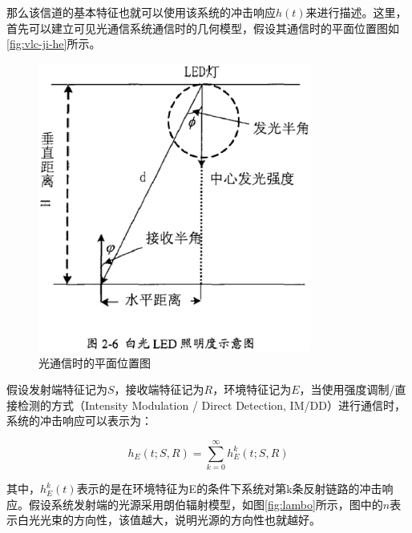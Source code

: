 那么该信道的基本特征也就可以使用该系统的冲击响应$h(t)$来进行描述。这里，首先可以建立可见光通信系统通信时的几何模型，假设其通信时的平面位置图如\autoref{fig:vlc-ji-he}所示。

\begin{figure}[htbp]
    \centering
	\includegraphics[width=0.8\textwidth]{figures/chapter-2/VlcJiHe.eps}
	\caption{光通信时的平面位置图}
	\label{fig:vlc-ji-he}
\end{figure}

假设发射端特征记为$S$，接收端特征记为$R$，环境特征记为$E$，当使用强度调制/直接检测的方式（Intensity Modulation / Direct Detection, IM/DD）进行通信时，系统的冲击响应可以表示为\cite{WuXia2014}：

\begin{equation}
    h_{E}(t;S,R) = \sum_{k=0}^\infty h_{E}^k(t;S,R)
\end{equation}

其中，$h_{E}^k(t)$表示的是在环境特征为E的条件下系统对第k条反射链路的冲击响应。假设系统发射端的光源采用朗伯辐射模型，如图\autoref{fig:lambo}所示\cite{ChenRan2013}，图中的$n$表示白光光束的方向性，该值越大，说明光源的方向性也就越好。

